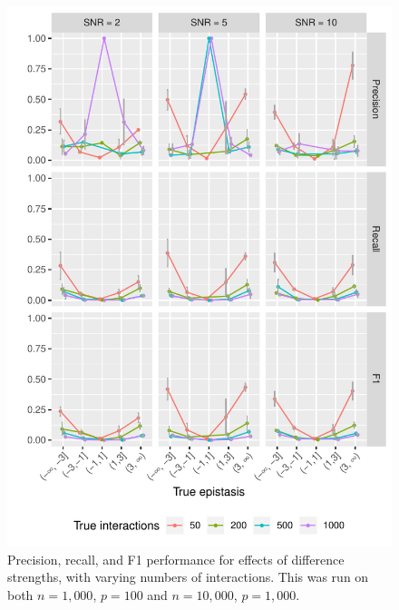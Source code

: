 \begin{figure}
\begin{minipage}{\linewidth}
	\includegraphics[width=0.5\linewidth]{"output/FXstrength_PRF_n10000_tyes_mult10_"}
\end{minipage}

\caption{Precision, recall, and F1 performance for effects of difference strengths, with varying numbers of interactions. This was run on both $n = 1,000$, $p = 100$ and $n = 10,000$, $p = 1,000$.	
}
\end{figure}

